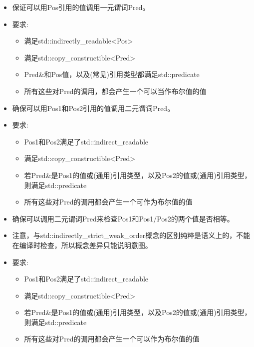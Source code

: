 \begin{itemize}
\item
保证可以用Pos引用的值调用一元谓词Pred。

\item
要求:
\begin{itemize}
\item
满足std::indirectly\_readable<Pos>

\item
满足std::copy\_constructible<Pred>

\item
Pred\&和Pos值，以及(常见)引用类型都满足std::predicate

\item
所有这些对Pred的调用，都会产生一个可以当作布尔值的值
\end{itemize}
\end{itemize}


\begin{itemize}
\item
确保可以用Pos1和Pos2引用的值调用二元谓词Pred。

\item
要求:
\begin{itemize}
\item
Pos1和Pos2满足了std::indirect\_readable

\item
满足std::copy\_constructible<Pred>

\item
若Pred\&是Pos1的值或(通用)引用类型，以及Pos2的值或(通用)引用类型，则满足std::predicate

\item
所有这些对Pred的调用都会产生一个可作为布尔值的值
\end{itemize}
\end{itemize}


\begin{itemize}
\item
确保可以调用二元谓词Pred来检查Pos1和Pos1/Pos2的两个值是否相等。

\item
注意，与std::indirectly\_strict\_weak\_order概念的区别纯粹是语义上的，不能在编译时检查，所以概念差异只能说明意图。

\item
要求:
\begin{itemize}
\item
Pos1和Pos2满足了std::indirect\_readable

\item
满足std::copy\_constructible<Pred>

\item
若Pred\&是Pos1的值或(通用)引用类型，以及Pos2的值或(通用)引用类型，则满足std::predicate

\item
所有这些对Pred的调用都会产生一个可以作为布尔值的值
\end{itemize}
\end{itemize}


